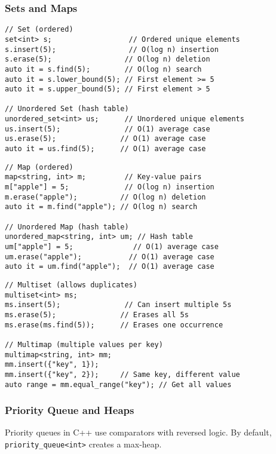 \documentclass[11pt,a4paper]{article}
\begin{document}
\subsubsection{Sets and Maps}

\begin{lstlisting}[caption={Set and Unordered Set}]
// Set (ordered)
set<int> s;                  // Ordered unique elements
s.insert(5);                 // O(log n) insertion
s.erase(5);                 // O(log n) deletion
auto it = s.find(5);        // O(log n) search
auto it = s.lower_bound(5); // First element >= 5
auto it = s.upper_bound(5); // First element > 5

// Unordered Set (hash table)
unordered_set<int> us;      // Unordered unique elements
us.insert(5);               // O(1) average case
us.erase(5);               // O(1) average case
auto it = us.find(5);      // O(1) average case
\end{lstlisting}

\begin{lstlisting}[caption={Map and Unordered Map}]
// Map (ordered)
map<string, int> m;         // Key-value pairs
m["apple"] = 5;             // O(log n) insertion
m.erase("apple");          // O(log n) deletion
auto it = m.find("apple"); // O(log n) search

// Unordered Map (hash table)
unordered_map<string, int> um; // Hash table
um["apple"] = 5;              // O(1) average case
um.erase("apple");           // O(1) average case
auto it = um.find("apple");  // O(1) average case
\end{lstlisting}


\begin{lstlisting}[caption={Multiset and Multimap Operations}]
// Multiset (allows duplicates)
multiset<int> ms;
ms.insert(5);               // Can insert multiple 5s
ms.erase(5);               // Erases all 5s
ms.erase(ms.find(5));      // Erases one occurrence

// Multimap (multiple values per key)
multimap<string, int> mm;
mm.insert({"key", 1});
mm.insert({"key", 2});     // Same key, different value
auto range = mm.equal_range("key"); // Get all values
\end{lstlisting}

\subsubsection{Priority Queue and Heaps}
Priority queues in C++ use comparators with reversed logic. By default, \texttt{priority\_queue<int>} creates a max-heap.
\end{document}
